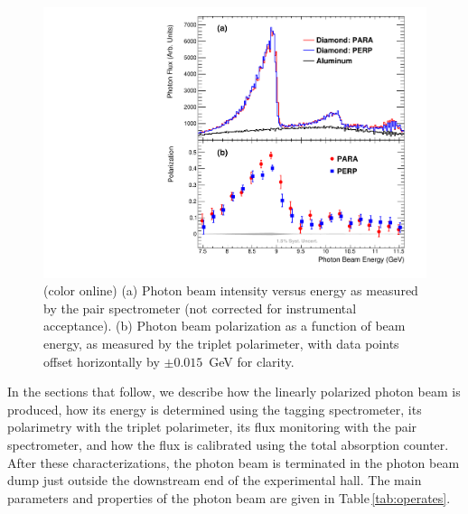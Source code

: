   
\begin{figure}[t]
\begin{center}
 \includegraphics[clip=true,width=0.5\linewidth]{figures/gx3102_pi0etaAsym2016_fig0_beam.pdf}
\end{center}
\caption{(color online) (a) Photon beam intensity versus energy as measured by the pair spectrometer (not corrected for instrumental acceptance).  (b) Photon beam polarization as a function of beam energy, as measured by the triplet polarimeter, with data points offset horizontally by $\pm0.015$~GeV for clarity.
        }
\label{fig:beam:gx3102_pi0etaAsym2016_fig0_beam} 
\end{figure}

In the sections that follow, we describe how the linearly polarized photon beam is produced, how its energy is determined using the tagging spectrometer, its polarimetry with the triplet polarimeter, its flux monitoring with the pair spectrometer, and how the flux is calibrated using the total absorption counter.
After these characterizations, the photon beam is terminated in the photon beam dump just outside the downstream end of the experimental hall.
The main parameters and properties of the photon beam are given in Table\,\ref{tab:operates}.
  



